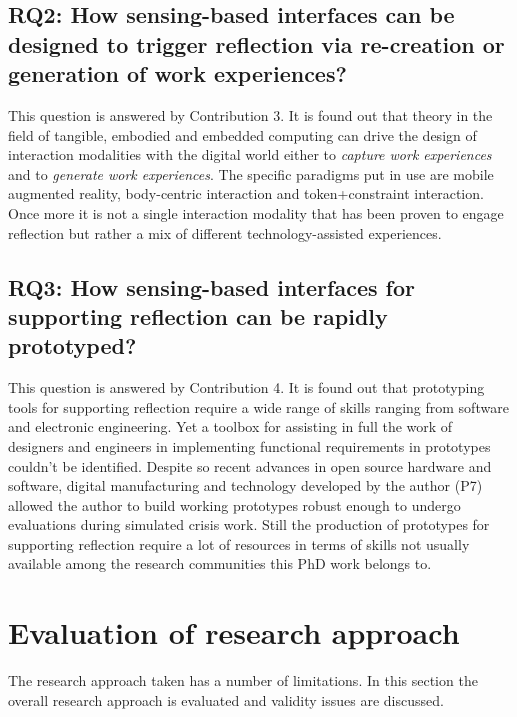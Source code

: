 \subsection{RQ2: How sensing-based interfaces can be designed to trigger reflection via re-creation or generation of work experiences?}\label{rq2-how-sensing-based-interfaces-can-be-designed-to-trigger-reflection-via-re-creation-or-generation-of-work-experiences}

This question is answered by Contribution 3. It is found out that theory in the field of tangible, embodied and embedded computing can drive the design of interaction modalities with the digital world either to \emph{capture work experiences} and to \emph{generate work experiences}. The specific paradigms put in use are mobile augmented reality, body-centric interaction and token+constraint interaction. Once more it is not a single interaction modality that has been proven to engage reflection but rather a mix of different technology-assisted experiences.

\subsection{RQ3: How sensing-based interfaces for supporting reflection can be rapidly prototyped?}\label{rq3-how-sensing-based-interfaces-for-supporting-reflection-can-be-rapidly-prototyped}

This question is answered by Contribution 4. It is found out that prototyping tools for supporting reflection require a wide range of skills ranging from software and electronic engineering. Yet a toolbox for assisting in full the work of designers and engineers in implementing functional requirements in prototypes couldn't be identified. Despite so recent advances in open source hardware and software, digital manufacturing and technology developed by the author (P7) allowed the author to build working prototypes robust enough to undergo evaluations during simulated crisis work. Still the production of prototypes for supporting reflection require a lot of resources in terms of skills not usually available among the research communities this PhD work belongs to.

\section{Evaluation of research approach}\label{evaluation-of-research-approach}

The research approach taken has a number of limitations. In this section the overall research approach is evaluated and validity issues are discussed.

